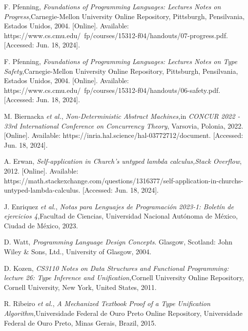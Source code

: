 \begin{thebibliography}{11}
    \label{sec:117}
    \hypertarget{117}{}
    F. Pfenning, \textit{Foundations of Programming Languages: Lectures Notes on Progress,}Carnegie-Mellon University Online Repository, Pittsburgh, Pensilvania, Estados Unidos, 2004. [Online]. Available: https://www.cs.cmu.edu/~fp/courses/15312-f04/handouts/07-progress.pdf. [Accessed: Jun. 18, 2024].

    \label{sec:118}
    \hypertarget{118}{}
    F. Pfenning, \textit{Foundations of Programming Languages: Lectures Notes on Type Safety,}Carnegie-Mellon University Online Repository, Pittsburgh, Pensilvania, Estados Unidos, 2004. [Online]. Available: https://www.cs.cmu.edu/~fp/courses/15312-f04/handouts/06-safety.pdf. [Accessed: Jun. 18, 2024].

    \label{sec:119}
    \hypertarget{119}{}
    M. Biernacka \textit{et al.}, \textit{Non-Deterministic Abstract Machines,}in \textit{CONCUR 2022 - 33rd International Conference on Concurrency Theory}, Varsovia, Polonia, 2022. [Online]. Available: https://inria.hal.science/hal-03772712/document. [Accessed: Jun. 18, 2024].

    \label{sec:120}
    \hypertarget{120}{}
    A. Erwan, \textit{Self-application in Church's untyped lambda calculus,}\textit{Stack Overflow}, 2012. [Online]. Available: https://math.stackexchange.com/questions/1316377/self-application-in-churchs-untyped-lambda-calculus. [Accessed: Jun. 18, 2024].

    \label{sec:121}
    \hypertarget{121}{}
    J. Enriquez \textit{et al.}, \textit{Notas para Lenguajes de Programación 2023-1: Boletín de ejercicios 4,}Facultad de Ciencias, Universidad Nacional Autónoma de México, Ciudad de México, 2023.

    \label{sec:122}
    \hypertarget{122}{}
    D. Watt, \textit{Programming Language Design Concepts}. Glasgow, Scotland: John Wiley \& Sons, Ltd., University of Glasgow, 2004.

    \label{sec:123}
    \hypertarget{123}{}
    D. Kozen, \textit{CS3110 Notes on Data Structures and Functional Programming: lecture 26: Type Inference and Unification,}Cornell University Online Repository, Cornell University, New York, United States, 2011.

    \label{sec:124}
    \hypertarget{124}{}
    R. Ribeiro \textit{et al.}, \textit{A Mechanized Textbook Proof of a Type Unification Algorithm,}Universidade Federal de Ouro Preto Online Repository, Universidade Federal de Ouro Preto, Minas Gerais, Brazil, 2015.


\end{thebibliography}

